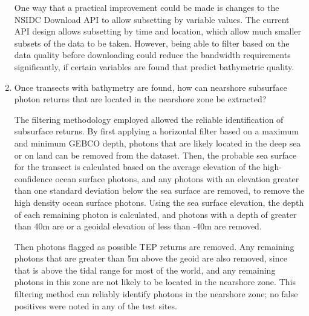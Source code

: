 \begin{enumerate}
    One way that a practical improvement could be made is changes to the NSIDC Download API to allow subsetting by variable values. The current API design allows subsetting by time and location, which allow much smaller subsets of the data to be taken. However, being able to filter based on the data quality before downloading could reduce the bandwidth requirements significantly, if certain variables are found that predict bathymetric quality. 
    
    \item Once transects with bathymetry are found, how can nearshore subsurface photon returns that are located in the nearshore zone be extracted?
    
        
    
    The filtering methodology employed allowed the reliable identification of subsurface returns. By first applying a horizontal filter based on a maximum and minimum GEBCO depth, photons that are likely located in the deep sea or on land can be removed from the dataset. Then, the probable sea surface for the transect is calculated based on the average elevation of the high-confidence ocean surface photons, and any photons with an elevation greater than one standard deviation below the sea surface are removed, to remove the high density ocean surface photons. Using the sea surface elevation, the depth of each remaining photon is calculated, and photons with a depth of greater than 40m are or a geoidal elevation of less than -40m are removed. 
    
    Then photons flagged as possible TEP returns  are removed. Any remaining photons that are greater than 5m above the geoid are also removed, since that is above the tidal range for most of the world, and any remaining photons in this zone are not likely to be located in the nearshore zone. 
    This filtering method can reliably identify photons in the nearshore zone; no false positives were noted in any of the test sites. 


\end{enumerate}
